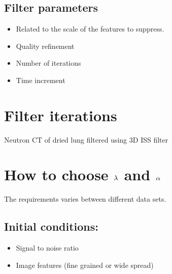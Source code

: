 \documentclass[letterpaper,10pt,english]{sphinxmanual}
\begin{document}
\subsection{Filter parameters}
\label{\detokenize{02-ImageEnhancement:filter-parameters}}\begin{itemize}
\item {} 
\sphinxAtStartPar
\sphinxstyleemphasis{\(\lambda\)} Related to the scale of the features to suppress.

\item {} 
\sphinxAtStartPar
\sphinxstyleemphasis{\(\alpha\)} Quality refinement

\item {} 
\sphinxAtStartPar
{} Number of iterations

\item {} 
\sphinxAtStartPar
\sphinxstyleemphasis{\(\tau\)} Time increment

\end{itemize}


\section{Filter iterations}
\label{\detokenize{02-ImageEnhancement:filter-iterations}}
\sphinxAtStartPar
Neutron CT of dried lung filtered using 3D ISS filter




\section{How to choose \protect\(\lambda\protect\) and \protect\(\alpha\protect\)}
\label{\detokenize{02-ImageEnhancement:how-to-choose-lambda-and-alpha}}
\sphinxAtStartPar
The requirements varies between different data sets.


\subsection{Initial conditions:}
\label{\detokenize{02-ImageEnhancement:initial-conditions}}\begin{itemize}
\item {} 
\sphinxAtStartPar
Signal to noise ratio

\item {} 
\sphinxAtStartPar
Image features (fine grained or wide spread)

\end{itemize}
\end{document}
